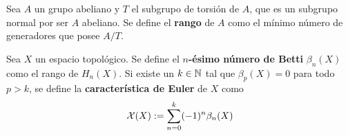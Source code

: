 Sea $A$ un grupo abeliano y $T$ el subgrupo de torsión de $A$, que es un
subgrupo normal por ser $A$ abeliano. Se define el \textbf{rango} de $A$ como el
mínimo número de generadores que posee $A/T$.

\begin{definition}
Sea $X$ un espacio topológico. Se define el \textbf{$n$-ésimo número de Betti}
$\beta_n(X)$ como el rango de $H_n(X)$. Si existe un $k \in \mathbb{N}$ tal que
$\beta_p(X)=0$ para todo $p > k$, se define la \textbf{característica de Euler}
de $X$ como 
\[\mathcal{X}(X):=\sum^k_{n=0}(-1)^n\beta_n(X)\]
\end{definition}